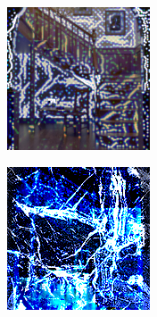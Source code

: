 \begin{figure}[]
\begin{subfigure}{\textwidth}
\begin{subfigure}{0.19\textwidth}
            \caption*{}
        \end{subfigure}
        \hfill
        \begin{subfigure}{0.19\textwidth}
            \centering
            \includegraphics[width=\textwidth]{images/04-experiment03/staircase_illum/marble/stats_proj.jpg}
            \caption*{}
        \end{subfigure}
        \hfill
        \begin{subfigure}{0.19\textwidth}
            \centering
            \includegraphics[width=\textwidth]{images/04-experiment03/staircase_illum/marble/pixel_im.jpg}

\end{subfigure}
\end{subfigure}
\end{figure}
